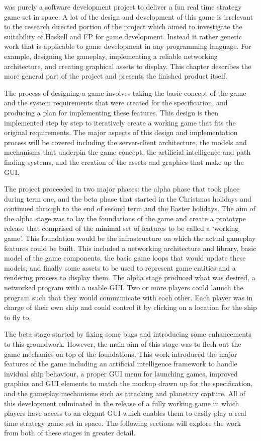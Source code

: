 
 was purely a software development project to deliver a fun real time strategy game set in space. A lot of the design and development of this game is irrelevant to the research directed portion of the project which aimed to investigate the suitability of Haskell and FP for game development. Instead it rather generic work that is applicable to game development in any programming language. For example, designing the gameplay, implementing a reliable networking architecture, and creating graphical assets to display. This chapter describes the more general part of the project and presents the finished product itself.

The process of designing a game involves taking the basic concept of the game and the system requirements that were created for the specification, and producing a plan for implementing these features. This design is then implemented step by step to iteratively create a working game that fits the original requirements. The major aspects of this design and implementation process will be covered including the server-client architecture, the models and mechanisms that underpin the game concept, the artificial intelligence and path finding systems, and the creation of the assets and graphics that make up the GUI.

The project proceeded in two major phases: the alpha phase that took place during term one, and the beta phase that started in the Christmas holidays and continued through to the end of second term and the Easter holidays. The aim of the alpha stage was to lay the foundations of the game and create a prototype release that comprised of the minimal set of features to be called a `working game'. This foundation would be the infrastructure on which the actual gameplay features could be built. This included a networking architecture and library, basic model of the game components, the basic game loops that would update these models, and finally some assets to be used to represent game entities and a rendering process to display them. The alpha stage produced what was desired, a networked program with a usable GUI. Two or more players could launch the program such that they would communicate with each other. Each player was in charge of their own ship and could control it by clicking on a location for the ship to fly to.

The beta stage started by fixing some bugs and introducing some enhancements to this groundwork. However, the main aim of this stage was to flesh out the game mechanics on top of the foundations. This work introduced the major features of the game including an artificial intelligence framework to handle invidual ship behaviour, a proper GUI menu for launching games, improved graphics and GUI elements to match the mockup drawn up for the specification, and the gameplay mechanisms such as attacking and planetary capture. All of this development culminated in the release of a fully working game in which players have access to an elegant GUI which enables them to easily play a real time strategy game set in space. The following sections will explore the work from both of these stages in greater detail.



